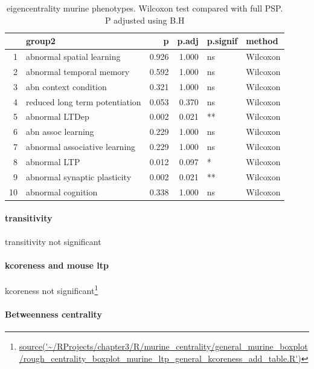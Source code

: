 \begin{table}[ht]
\centering
\begin{tabular}{rlrrll}
  \toprule
 & group2 & p & p.adj & p.signif & method \\ 
  \midrule
1 & abnormal spatial learning & 0.926 & 1.000 & ns & Wilcoxon \\ 
  2 & abnormal temporal memory & 0.592 & 1.000 & ns & Wilcoxon \\ 
  3 & abn context condition & 0.321 & 1.000 & ns & Wilcoxon \\ 
  4 & reduced long term potentiation & 0.053 & 0.370 & ns & Wilcoxon \\ 
  5 & abnormal LTDep & 0.002 & 0.021 & ** & Wilcoxon \\ 
  6 & abn assoc learning & 0.229 & 1.000 & ns & Wilcoxon \\ 
  7 & abnormal associative learning & 0.229 & 1.000 & ns & Wilcoxon \\ 
  8 & abnormal LTP & 0.012 & 0.097 & * & Wilcoxon \\ 
  9 & abnormal synaptic plasticity & 0.002 & 0.021 & ** & Wilcoxon \\ 
  10 & abnormal cognition & 0.338 & 1.000 & ns & Wilcoxon \\ 
   \bottomrule
\end{tabular}
\caption{eigencentrality murine phenotypes. Wilcoxon test compared with full PSP. P adjusted using B.H} 
\label{tab:eigencentrality murine phenotypes. Wilcoxon test compared with full PSP}
\end{table}
\paragraph{transitivity}

transitivity not significant


\paragraph{kcoreness and mouse ltp}
kcoreness not significant\footnote{\url{source('~/RProjects/chapter3/R/murine_centrality/general_murine_boxplot/rough_centrality_boxplot_murine_ltp_general_kcoreness_add_table.R')}}


\paragraph{Betweenness centrality}






